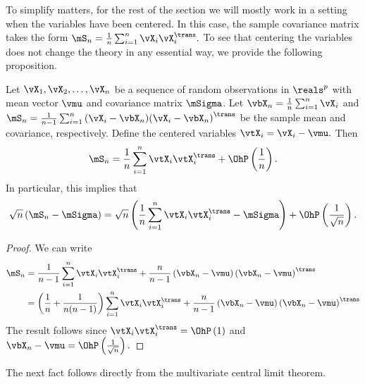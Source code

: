 To simplify matters, for the rest of the section we will mostly work in a setting when the variables have been centered.  In this case, the sample covariance matrix takes the form
\(
    \mS_n = \frac{1}{n} \sum_{i=1}^n \vX_i \vX_i^\trans.
\)
To see that centering the variables does not change the theory in any essential way, we provide the following proposition.

\begin{proposition}
Let $\vX_1, \vX_2, \ldots, \vX_n$ be a sequence of random observations in $\reals^p$ with mean vector $\vmu$ and covariance matrix $\mSigma$.  Let
\(
    \vbX_n = \frac{1}{n} \sum_{i=1}^n \vX_i
\)
and
\(
    \mS_n
    =
    \frac{1}{n-1}
    \sum_{i=1}^n
        \left( \vX_i - \vbX_n \right) \!
        \left( \vX_i - \vbX_n \right)^\trans
\)
be the sample mean and covariance, respectively.  Define the centered
variables
\(
    \vtX_i = \vX_i - \vmu.
\)
Then
\[
    \mS_n
    =
    \frac{1}{n}
    \sum_{i=1}^n
        \vtX_i \vtX_i^\trans
    +
    \OhP\left( \frac{1}{n} \right).
\]
In particular, this implies that
\[
    \sqrt{n}
    \left(
        \mS_n - \mSigma
    \right)
    =
    \sqrt{n}
    \left(
        \frac{1}{n}
        \sum_{i=1}^n
            \vtX_i \vtX_i^\trans
        -
        \mSigma
    \right)
    + 
    \OhP \left( \frac{1}{\sqrt{n}} \right).
\]
\end{proposition}
\begin{proof}
We can write
\begin{align*}
    \mS_n &= \frac{1}{n-1}
             \sum_{i=1}^n \vtX_i \vtX_i^\trans
             +
             \frac{n}{n-1}
             \left(
                \vbX_n - \vmu
             \right)
             \left(
                \vbX_n - \vmu
             \right)^\trans \\
          &= \left(
                \frac{1}{n}
                +
                \frac{1}{n (n-1) }
             \right)
             \sum_{i=1}^n \vtX_i \vtX_i^\trans
             +
             \frac{n}{n-1}
             \left(
                \vbX_n - \vmu
             \right)
             \left(
                \vbX_n - \vmu
             \right)^\trans
\end{align*}
The result follows since
\(
    \vtX_i \vtX_i^\trans = \OhP \left( 1 \right)
\)
and
\(
    \vbX_n - \vmu 
    = 
    \OhP \left( \frac{1}{ \sqrt{n} } \right).
\)

\end{proof}

The next fact follows directly from the multivariate central limit theorem.

